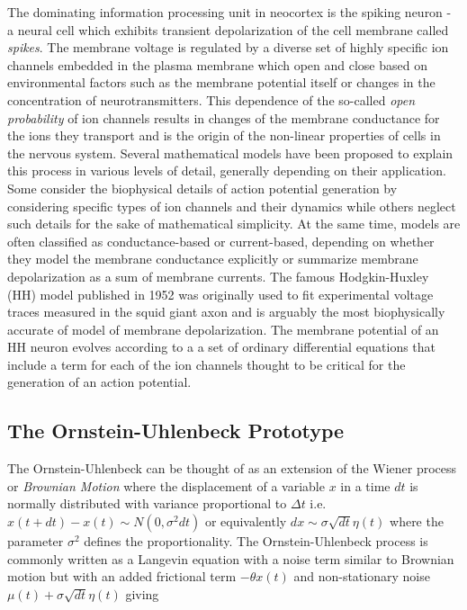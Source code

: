 \documentclass{ucetd}
\begin{document}
The dominating information processing unit in neocortex is the spiking neuron - a neural cell which exhibits transient depolarization of the cell membrane called \emph{spikes}. The membrane voltage is regulated by a diverse set of highly specific ion channels embedded in the plasma membrane which open and close based on environmental factors such as the membrane potential itself or changes in the concentration of neurotransmitters. This dependence of the so-called \emph{open probability} of ion channels results in changes of the membrane conductance for the ions they transport and is the origin of the non-linear properties of  cells in the nervous system. Several mathematical models have been proposed to explain this process in various levels of detail, generally depending on their application. Some consider the biophysical details of action potential generation by considering specific types of ion channels and their dynamics while others neglect such details for the sake of mathematical simplicity. At the same time, models are often classified as conductance-based or current-based, depending on whether they model the membrane conductance explicitly or summarize membrane depolarization as a sum of membrane currents. The famous Hodgkin-Huxley (HH) model published in 1952 was originally used to fit experimental voltage traces measured in the squid giant axon and is arguably the most biophysically accurate of model of membrane depolarization. The membrane potential of an HH neuron evolves according to a a set of ordinary differential equations that include a term for each of the ion channels thought to be critical for the generation of an action potential.



\subsection{The Ornstein-Uhlenbeck Prototype}

The Ornstein-Uhlenbeck can be thought of as an extension of the Wiener process or \emph{Brownian Motion} where the displacement of a variable $x$ in a time $dt$ is normally distributed with variance proportional to $\Delta t$ i.e. $x(t+dt) - x(t) \sim N(0, \sigma^{2}dt)$ or equivalently $dx \sim \sigma\sqrt{dt}\eta(t)$ where the parameter $\sigma^{2}$ defines the proportionality. The Ornstein-Uhlenbeck process is commonly written as a Langevin equation with a noise term similar to Brownian motion but with an added frictional term $-\theta x(t)$ and non-stationary noise $\mu(t) + \sigma\sqrt{dt}\eta(t)$ giving
\end{document}
